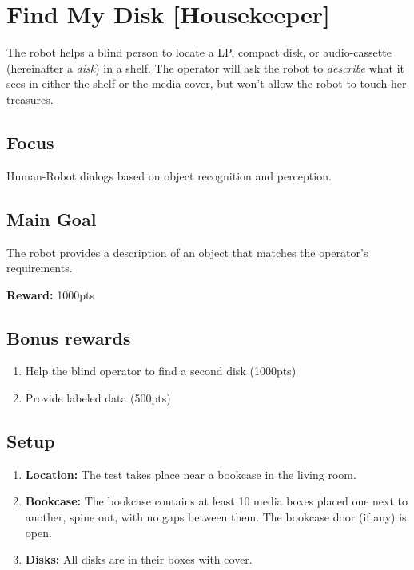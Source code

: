 \section{Find My Disk [Housekeeper]}
The robot helps a blind person to locate a LP, compact disk, or audio-cassette (hereinafter a \textit{disk}) in a shelf. The operator will ask the robot to \emph{describe} what it sees in either the shelf or the media cover, but won't allow the robot to touch her treasures.

\subsection{Focus}
Human-Robot dialogs based on object recognition and perception.

\subsection{Main Goal}
The robot provides a description of an object that matches the operator's requirements.

\noindent\textbf{Reward:} 1000pts\\

\subsection{Bonus rewards}
\begin{enumerate}[nosep]
	\item Help the blind operator to find a second disk (1000pts)
	\item Provide labeled data (500pts)
\end{enumerate}

%
%
\subsection{Setup}
\begin{enumerate}
	\item \textbf{Location:} The test takes place near a bookcase in the living room.

	\item \textbf{Bookcase:} The bookcase contains at least 10 media boxes placed one next to another, spine out, with no gaps between them. The bookcase door (if any) is open.

	\item \textbf{Disks:} All disks are in their boxes with cover.
\end{enumerate}


